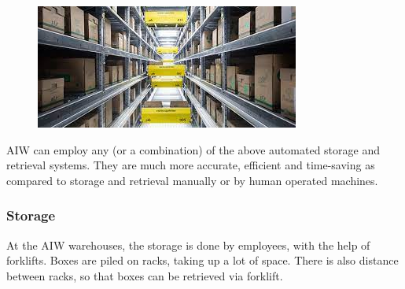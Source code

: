\documentclass{report}
\begin{document}
\begin{itemize}
\begin{figure}[H]
    
    \centering
    \includegraphics[scale=0.8]{shuttle}
    \caption{}
    
\end{figure}

\end{itemize}

AIW can employ any (or a combination) of the above automated storage and retrieval systems. They are much more accurate, efficient and time-saving as compared to storage and retrieval manually or by human operated machines.

\subsubsection{Storage}
At the AIW warehouses, the storage is done by employees, with the help of forklifts. Boxes are piled on racks, taking up a lot of space. There is also distance between racks, so that boxes can be retrieved via forklift.
\end{document}
